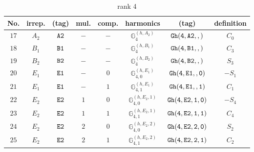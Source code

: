 \documentclass[fleqn,8pt]{jsarticle}
\begin{document}
\begin{table}[ht!]
\begin{center}
\caption{rank 4}
\renewcommand{\arraystretch}{1.3}
\begin{tabular}{cccccccc} \hline \hline
No. & irrep. & (tag) & mul. & comp. & harmonics & (tag) & definition \\ \hline
$ 17 $ & $ A_{2} $ & $ {\tt A2} $ & $ - $ & $ - $ & $ \mathbb{G}_{4}^{(h,A_{2})} $ & $ {\tt Gh(4,A2,,)} $ & $ C_{0} $ \\
$ 18 $ & $ B_{1} $ & $ {\tt B1} $ & $ - $ & $ - $ & $ \mathbb{G}_{4}^{(h,B_{1})} $ & $ {\tt Gh(4,B1,,)} $ & $ C_{3} $ \\
$ 19 $ & $ B_{2} $ & $ {\tt B2} $ & $ - $ & $ - $ & $ \mathbb{G}_{4}^{(h,B_{2})} $ & $ {\tt Gh(4,B2,,)} $ & $ S_{3} $ \\
$ 20 $ & $ E_{1} $ & $ {\tt E1} $ & $ - $ & $ 0 $ & $ \mathbb{G}_{4,0}^{(h,E_{1})} $ & $ {\tt Gh(4,E1,,0)} $ & $ - S_{1} $ \\
$ 21 $ & $ E_{1} $ & $ {\tt E1} $ & $ - $ & $ 1 $ & $ \mathbb{G}_{4,1}^{(h,E_{1})} $ & $ {\tt Gh(4,E1,,1)} $ & $ C_{1} $ \\
$ 22 $ & $ E_{2} $ & $ {\tt E2} $ & $ 1 $ & $ 0 $ & $ \mathbb{G}_{4,0}^{(h,E_{2},1)} $ & $ {\tt Gh(4,E2,1,0)} $ & $ - S_{4} $ \\
$ 23 $ & $ E_{2} $ & $ {\tt E2} $ & $ 1 $ & $ 1 $ & $ \mathbb{G}_{4,1}^{(h,E_{2},1)} $ & $ {\tt Gh(4,E2,1,1)} $ & $ C_{4} $ \\
$ 24 $ & $ E_{2} $ & $ {\tt E2} $ & $ 2 $ & $ 0 $ & $ \mathbb{G}_{4,0}^{(h,E_{2},2)} $ & $ {\tt Gh(4,E2,2,0)} $ & $ S_{2} $ \\
$ 25 $ & $ E_{2} $ & $ {\tt E2} $ & $ 2 $ & $ 1 $ & $ \mathbb{G}_{4,1}^{(h,E_{2},2)} $ & $ {\tt Gh(4,E2,2,1)} $ & $ C_{2} $ \\
 \hline \hline
\end{tabular}
\end{center}
\end{table}
\end{document}
